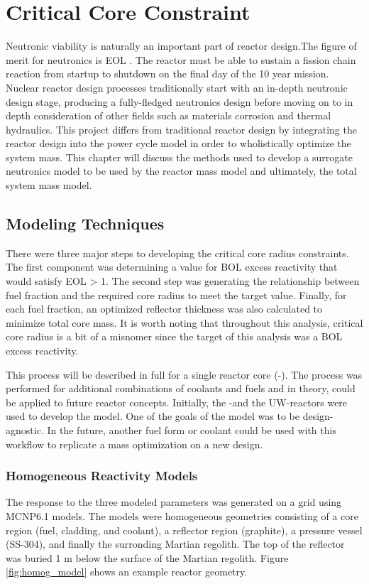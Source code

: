 \chapter{Critical Core Constraint}\label{ch:crit_radius}

Neutronic viability is naturally an important part of reactor design.The figure of merit
for neutronics is EOL \keff. The reactor must be able to sustain a fission
chain reaction from startup to shutdown on the final day of the 10 year
mission. Nuclear reactor design processes traditionally start with an in-depth
neutronic design stage, producing a fully-fledged neutronics design before
moving on to in depth consideration of other fields such as materials corrosion
and thermal hydraulics. This project differs from traditional reactor design by
integrating the reactor design into the power cycle model in order to
wholistically optimize the system mass. This chapter will discuss the methods
used to develop a surrogate neutronics model to be used by the reactor mass
model and ultimately, the total system mass model.

\section{Modeling Techniques}
There were three major steps to developing the critical core radius
constraints. The first component was determining a value for BOL excess reactivity that would satisfy
EOL \keff > 1. The second step was generating the relationship between fuel fraction and the
required core radius to meet the target \keff value. Finally, for each fuel fraction, an
optimized reflector thickness was also calculated to minimize total core mass.
It is worth noting that throughout this analysis, critical core radius is a
bit of a misnomer since the target of this analysis was a BOL excess
reactivity.

This process will be described in full for a single reactor core (\uox-\codiox). The process
was performed for additional combinations of coolants and fuels and in theory,
could be applied to future reactor concepts. Initially, the \uox-\codiox and the
UW-\codiox reactors were used to develop the model. One of the goals of the
model was to be design-agnostic. In the future, another fuel form or coolant could be used
with this workflow to replicate a mass optimization on a new design.

\subsection{Homogeneous Reactivity Models}
The \keff response to the three modeled parameters was generated on a grid using
MCNP6.1 models. The models were homogeneous geometries consisting of
a core region (fuel, cladding, and coolant), a reflector region (graphite), a
pressure vessel (SS-304), and finally the surronding Martian regolith. The top of the
reflector was buried 1 m below the surface of the Martian regolith. Figure
\ref{fig:homog_model} shows an example reactor geometry.

